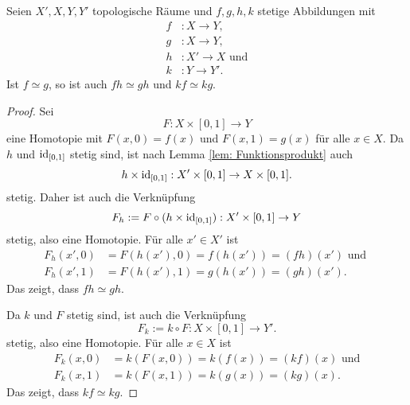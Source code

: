 \documentclass[a4paper,10pt]{article}
\begin{document}
\section{}
\begin{lem}\label{lem: Verknüpfung erhält Homotopie}
 Seien $X', X, Y, Y'$ topologische Räume und $f,g,h,k$ stetige Abbildungen mit
 \begin{align*}
  f &: X \to Y, \\
  g &: X \to Y, \\
  h &: X' \to X \text{ und}\\
  k &: Y \to Y'.
 \end{align*}
 Ist $f \simeq g$, so ist auch $fh \simeq gh$ und $kf \simeq kg$.
\end{lem}
\begin{proof}
 Sei
 \[
  F : X \times [0,1] \to Y
 \]
 eine Homotopie mit $F(x,0) = f(x)$ und $F(x,1) = g(x)$ für alle $x \in X$. Da $h$ und $\operatorname{id}_{[0,1]}$ stetig sind, ist nach Lemma \ref{lem: Funktionsprodukt} auch
 \[
  h \times \operatorname{id}_{[0,1]} : X' \times [0,1] \to X \times [0,1].
 \]
 stetig. Daher ist auch die Verknüpfung
 \[
  F_h := F \circ (h \times \operatorname{id}_{[0,1]}) : X' \times [0,1] \to Y
 \]
 stetig, also eine Homotopie. Für alle $x' \in X'$ ist
 \begin{align*}
  F_h(x',0) &= F(h(x'),0) = f(h(x')) = (fh)(x') \text{ und } \\
  F_h(x',1) &= F(h(x'),1) = g(h(x')) = (gh)(x').
 \end{align*}
 Das zeigt, dass $fh \simeq gh$.
 
 Da $k$ und $F$ stetig sind, ist auch die Verknüpfung
 \[
  F_k := k \circ F : X \times [0,1] \to Y'. 
 \]
 stetig, also eine Homotopie. Für alle $x \in X$ ist
 \begin{align*}
  F_k(x,0) &= k(F(x,0)) = k(f(x)) = (kf)(x) \text{ und} \\
  F_k(x,1) &= k(F(x,1)) = k(g(x)) = (kg)(x).
 \end{align*}
 Das zeigt, dass $kf \simeq kg$.
\end{proof}
\end{document}
